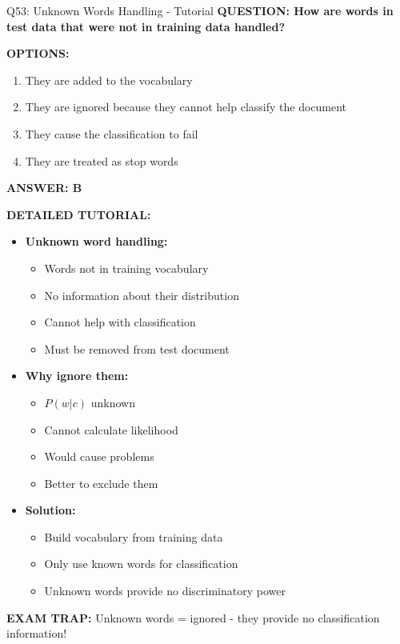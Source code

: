 \documentclass[8pt]{beamer}
\begin{document}
	\begin{frame}{Q53: Unknown Words Handling - Tutorial}
		\fontsize{6.5}{7.5}\selectfont
		\textbf{QUESTION: How are words in test data that were not in training data handled?}
		
		\vspace{0.1cm}
		\textbf{OPTIONS:}
		\begin{enumerate}
			\item They are added to the vocabulary
			\item They are ignored because they cannot help classify the document
			\item They cause the classification to fail
			\item They are treated as stop words
		\end{enumerate}
		
		\vspace{0.1cm}
		\textcolor{myblue}{\textbf{ANSWER: B}}
		
		\vspace{0.1cm}
		\textbf{DETAILED TUTORIAL:}
		\begin{itemize}
			\item \textbf{Unknown word handling:}
			\begin{itemize}
				\item Words not in training vocabulary
				\item No information about their distribution
				\item Cannot help with classification
				\item Must be removed from test document
			\end{itemize}
			\item \textbf{Why ignore them:}
			\begin{itemize}
				\item $P(w|c)$ unknown
				\item Cannot calculate likelihood
				\item Would cause problems
				\item Better to exclude them
			\end{itemize}
			\item \textbf{Solution:}
			\begin{itemize}
				\item Build vocabulary from training data
				\item Only use known words for classification
				\item Unknown words provide no discriminatory power
			\end{itemize}
		\end{itemize}
		
		\textcolor{myred}{\textbf{EXAM TRAP:}} Unknown words = \textcolor{myblue}{ignored} - they provide no classification information!
	\end{frame}
	
\end{document}
